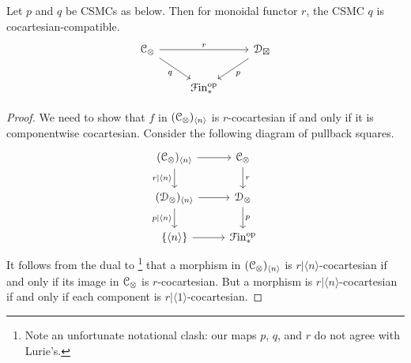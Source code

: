 \documentclass[main.tex]{subfiles}
\begin{document}
\begin{lemma}
  \label{lemma:cocartesian_iff_componentwise_cocartesian}
  Let $p$ and $q$ be CSMCs as below. Then for monoidal functor $r$, the CSMC $q$ is cocartesian-compatible.
  \begin{equation*}
    \begin{tikzcd}
      \category{C}_{\otimes}
      \arrow[rr, "r"]
      \arrow[dr, swap, "q"]
      && \category{D}_{\boxtimes}
      \arrow[dl, "p"]
      \\
      & \Finp\op
    \end{tikzcd}
  \end{equation*}
\end{lemma}
\begin{proof}
  We need to show that $f$ in $(\mathcal{C}_{\otimes})_{\langle n \rangle}$ is $r$-cocartesian if and only if it is componentwise cocartesian. Consider the following diagram of pullback squares.
  \begin{equation*}
    \begin{tikzcd}
      (\category{C}_{\otimes})_{\langle n \rangle}
      \arrow[r]
      \arrow[d, swap, "r|\langle n \rangle"]
      & \category{C}_{\otimes}
      \arrow[d, "r"]
      \\
      (\category{D}_{\otimes})_{\langle n \rangle}
      \arrow[r]
      \arrow[d, swap, "p|\langle n \rangle"]
      & \category{D}_{\otimes}
      \arrow[d, "p"]
      \\
      \{\langle n \rangle\}
      \arrow[r]
      & \Finp\op
    \end{tikzcd}
  \end{equation*}
  It follows from the dual to \cite[Cor.~4.3.1.15]{highertopostheory}\footnote{Note an unfortunate notational clash: our maps $p$, $q$, and $r$ do not agree with Lurie's.} that a morphism in $(\mathcal{C}_{\otimes})_{\langle n \rangle}$ is $r|\langle n \rangle$-cocartesian if and only if its image in $\mathcal{C}_{\otimes}$ is $r$-cocartesian. But a morphism is $r|\langle n \rangle$-cocartesian if and only if each component is $r|\langle 1 \rangle$-cocartesian.
\end{proof}
\end{document}
